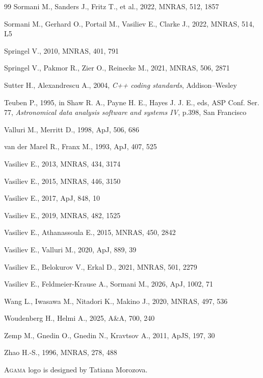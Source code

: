 \documentclass[12pt]{article}
\newcommand{\Agama}{\textsc{Agama}\xspace}
\begin{document}
\begin{thebibliography}{99}
Sormani M., Sanders J., Fritz T., et al., 2022, MNRAS, 512, 1857

Sormani M., Gerhard O., Portail M., Vasiliev E., Clarke J., 2022, MNRAS, 514, L5

Springel V., 2010, MNRAS, 401, 791

Springel V., Pakmor R., Zier O., Reinecke M., 2021, MNRAS, 506, 2871

Sutter H., Alexandrescu A., 2004, \textsl{C++ coding standards}, Addison--Wesley

Teuben P., 1995, in Shaw R. A., Payne H. E., Hayes J. J. E., eds, ASP Conf. Ser. 77,
\textsl{Astronomical data analysis software and systems IV}, p.398, San Francisco

Valluri M., Merritt D., 1998, ApJ, 506, 686

van der Marel R., Franx M., 1993, ApJ, 407, 525

Vasiliev E., 2013, MNRAS, 434, 3174

Vasiliev E., 2015, MNRAS, 446, 3150

Vasiliev E., 2017, ApJ, 848, 10

Vasiliev E., 2019, MNRAS, 482, 1525

Vasiliev E., Athanassoula E., 2015, MNRAS, 450, 2842

Vasiliev E., Valluri M., 2020, ApJ, 889, 39

Vasiliev E., Belokurov V., Erkal D., 2021, MNRAS, 501, 2279

Vasiliev E., Feldmeier-Krause A., Sormani M., 2026, ApJ, 1002, 71

Wang L., Iwasawa M., Nitadori K., Makino J., 2020, MNRAS, 497, 536

Woudenberg H., Helmi A., 2025, A\&A, 700, 240

Zemp M., Gnedin O., Gnedin N., Kravtsov A., 2011, ApJS, 197, 30

Zhao H.-S., 1996, MNRAS, 278, 488

\end{thebibliography}

\vspace{-3mm}\noindent \Agama logo is designed by Tatiana Morozova.
\end{document}
